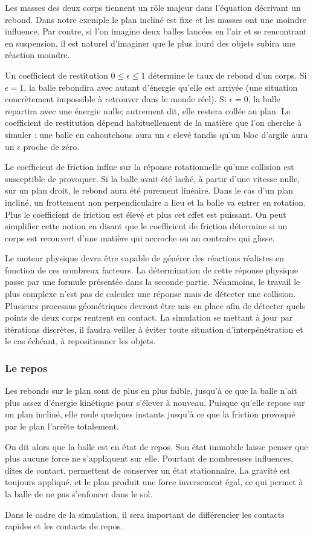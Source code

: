 Les masses des deux corps tiennent un rôle majeur dans l'équation décrivant un rebond. Dans notre exemple le plan incliné est fixe et les masses ont une moindre influence. Par contre, si l'on imagine deux balles lancées en l'air et se rencontrant en suspension, il est naturel d'imaginer que le plus lourd des objets subira une réaction moindre.

Un coefficient de restitution $0 \leq \epsilon \leq 1$ détermine le taux de rebond d'un corps. Si $\epsilon = 1$, la balle rebondira avec autant d'énergie qu'elle est arrivée (une situation concrètement impossible à retrouver dans le monde réel). Si $\epsilon = 0$, la balle repartira avec une énergie nulle; autrement dit, elle restera collée au plan. Le coefficient de restitution dépend habituellement de la matière que l'on cherche à simuler : une balle en cahoutchouc aura un $\epsilon$ elevé tandis qu'un bloc d'argile aura un $\epsilon$ proche de zéro.

Le coefficient de friction influe sur la réponse rotationnelle qu'une collision est susceptible de provoquer. Si la balle avait été laché, à partir d'une vitesse nulle, sur un plan droit, le rebond aura été purement linéaire. Dans le cas d'un plan incliné, un frottement non perpendiculaire a lieu et la balle va entrer en rotation. Plus le coefficient de friction est élevé et plus cet effet est puissant. On peut simplifier cette notion en disant que le coefficient de friction détermine si un corps est recouvert d'une matière qui accroche ou au contraire qui glisse.

Le moteur physique devra être capable de générer des réactions réalistes en fonction de ces nombreux facteurs. La détermination de cette réponse physique passe par une formule présentée dans la seconde partie. Néanmoins, le travail le plus complexe n'est pas de calculer une réponse mais de détecter une collision. Plusieurs processus géométriques devront être mis en place afin de détecter quels points de deux corps rentrent en contact. La simulation se mettant à jour par itérations discrètes, il faudra veiller à éviter toute situation d'interpénétration et le cas échéant, à repositionner les objets.

\subsubsection{Le repos}

Les rebonds sur le plan sont de plus en plus faible, jusqu'à ce que la balle n'ait plus assez d'énergie kinétique pour s'élever à nouveau. Puisque qu'elle repose sur un plan incliné, elle roule quelques instants jusqu'à ce que la friction provoqué par le plan l'arrête totalement.

On dit alors que la balle est en état de repos. Son état immobile laisse penser que plus aucune force ne s'appliquent sur elle. Pourtant de nombreuses influences, dites de contact, permettent de conserver un état stationnaire. La gravité est toujours appliqué, et le plan produit une force inversement égal, ce qui permet à la balle de ne pas s'enfoncer dans le sol.

Dans le cadre de la simulation, il sera important de différencier les contacts rapides et les contacts de repos.

